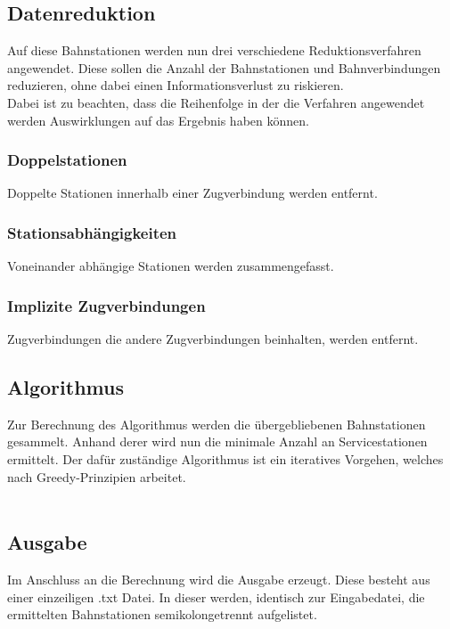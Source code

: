 \subsection{Datenreduktion}\label{auf:subsubsec:datenreduktion}
Auf diese Bahnstationen werden nun drei verschiedene Reduktionsverfahren angewendet. Diese sollen die Anzahl der Bahnstationen und Bahnverbindungen reduzieren, ohne dabei einen Informationsverlust zu riskieren.\\
Dabei ist zu beachten, dass die Reihenfolge in der die Verfahren angewendet werden Auswirklungen auf das Ergebnis haben können.

\subsubsection{Doppelstationen}\label{auf:subsubsec:doppelstationen}
Doppelte Stationen innerhalb einer Zugverbindung werden entfernt.

\subsubsection{Stationsabhängigkeiten}\label{auf:subsubsec:stationsabhaengigkeiten}
Voneinander abhängige Stationen werden zusammengefasst.

\subsubsection{Implizite Zugverbindungen}\label{auf:subsubsec:implizite-zugverbindungen}
Zugverbindungen die andere Zugverbindungen beinhalten, werden entfernt.
\\
\subsection{Algorithmus}\label{auf:subsec:algorithmus}
Zur Berechnung des Algorithmus werden die übergebliebenen Bahnstationen gesammelt. Anhand derer wird nun die minimale Anzahl an Servicestationen ermittelt. Der dafür zuständige Algorithmus ist ein iteratives Vorgehen, welches nach Greedy-Prinzipien arbeitet.\\
\\
\subsection{Ausgabe}\label{auf:subsec:ausgabe}
Im Anschluss an die Berechnung wird die Ausgabe erzeugt. Diese besteht aus einer einzeiligen .txt Datei. In dieser werden, identisch zur Eingabedatei, die ermittelten Bahnstationen semikolongetrennt aufgelistet.\\

